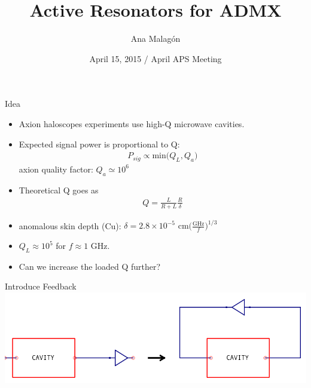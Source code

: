 \documentclass{beamer}
\title[April APS]
{Active Resonators for ADMX}
\author[Malagon]
{Ana Malag\'on}
\institute[University of Washington]
{University of Washington, ADMX Collaboration}
\date[April 15, 2015]
{April 15, 2015 / April APS Meeting}
\begin{document}
\begin{frame}
\titlepage
\end{frame}

\begin{frame}{Idea}
\begin{itemize}
\item Axion haloscopes experiments use high-Q microwave cavities.

\item Expected signal power is proportional to Q:
\begin{align*}
P_{sig} \propto \text{min}\big(Q_L, Q_a\big)
\end{align*}
axion quality factor: $Q_a \simeq 10^6$
\item Theoretical Q goes as 
\begin{align*}
Q = \frac{L}{R+L}\frac{R}{\delta}
\end{align*}

\item anomalous skin depth (Cu): $\delta = 2.8\times10^{-5}\text{ cm}\bigg(\frac{\text{GHz}}{f}\bigg)^{1/3}$

\item  $Q_L \approx 10^5$ for $f \approx 1$ GHz.


\item Can we increase the loaded Q further? 
\end{itemize}
\end{frame}

\begin{frame}{Introduce Feedback}
\centering
\includegraphics[width=\textwidth]{cavity_linear_to_nonlinear}

\end{frame}

%
\end{document}
